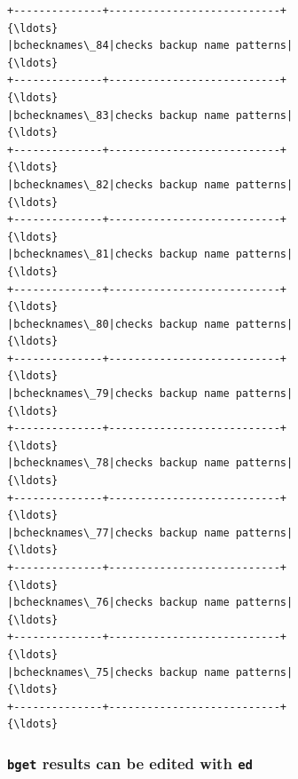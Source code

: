 \documentclass[11pt,letter,landscape]{article}
\begin{document}
    \begin{Verbatim}[commandchars=\\\{\}]
+--------------+---------------------------+                                               {\ldots} 
|bchecknames\_84|checks backup name patterns|                                               {\ldots} 
+--------------+---------------------------+                                               {\ldots} 
|bchecknames\_83|checks backup name patterns|                                               {\ldots} 
+--------------+---------------------------+                                               {\ldots} 
|bchecknames\_82|checks backup name patterns|                                               {\ldots} 
+--------------+---------------------------+                                               {\ldots} 
|bchecknames\_81|checks backup name patterns|                                               {\ldots} 
+--------------+---------------------------+                                               {\ldots} 
|bchecknames\_80|checks backup name patterns|                                               {\ldots} 
+--------------+---------------------------+                                               {\ldots} 
|bchecknames\_79|checks backup name patterns|                                               {\ldots} 
+--------------+---------------------------+                                               {\ldots} 
|bchecknames\_78|checks backup name patterns|                                               {\ldots} 
+--------------+---------------------------+                                               {\ldots} 
|bchecknames\_77|checks backup name patterns|                                               {\ldots} 
+--------------+---------------------------+                                               {\ldots} 
|bchecknames\_76|checks backup name patterns|                                               {\ldots} 
+--------------+---------------------------+                                               {\ldots} 
|bchecknames\_75|checks backup name patterns|                                               {\ldots} 
+--------------+---------------------------+                                               {\ldots} 

    \end{Verbatim}

    \subsubsection{\texorpdfstring{\texttt{bget} results can be edited with
\texttt{ed}}{bget results can be edited with ed}}\label{bget-results-can-be-edited-with-ed}
\end{document}
